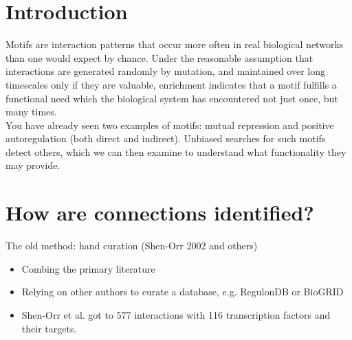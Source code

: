 \documentclass{article}
\begin{document}
\large

\section*{Introduction}

Motifs are interaction patterns that occur more often in real biological networks than one would expect by chance. Under the reasonable assumption that interactions are generated randomly by mutation, and maintained over long timescales only if they are valuable, enrichment indicates that a motif fulfills a functional need which the biological system has encountered not just once, but many times.\\

You have already seen two examples of motifs: mutual repression and positive autoregulation (both direct and indirect). Unbiased searches for such motifs detect others, which we can then examine to understand what functionality they may provide.

\section*{How are connections identified?}

The old method: hand curation (Shen-Orr 2002 and others) 
\begin{itemize}
\item Combing the primary literature
\item Relying on other authors to curate a database, e.g. RegulonDB or BioGRID
\item Shen-Orr et al. got to 577 interactions with 116 transcription factors and their targets.
\end{itemize}
\end{document}
